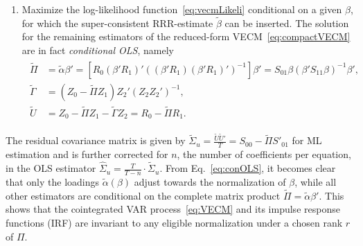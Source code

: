 \begin{enumerate}[label=\textbf{\arabic*.}]
	\item Maximize the log-likelihood function~\eqref{eq:vecmLikeli} conditional on a given $ \beta $, for which the super-consistent RRR-estimate $ \widetilde{\beta} $ can be inserted. The solution for the remaining estimators of the reduced-form VECM~\eqref{eq:compactVECM} are in fact \textit{conditional OLS}, namely
	\begin{align} \label{eq:conOLS}
	\begin{split}
		\widetilde{\Pi} & = \widetilde{\alpha} \beta' = \left[ R^{\ }_0 \left( \beta'R^{\ }_1 \right)' \left( \left( \beta'R^{\ }_1 \right) \left( \beta'R^{\ }_1 \right)' \right)^{-1} \right] \beta' = S_{01} \beta \left( \beta' S_{11} \beta \right)^{-1} \beta', \\
		\widetilde{\Gamma} & = \left( Z^{\ }_0 - \widetilde{\Pi} Z^{\ }_1 \right) Z_2'(Z^{\ }_2 Z_2')^{-1}, \\
		\widetilde{U} & = Z^{\ }_0 - \widetilde{\Pi} Z^{\ }_1 - \widetilde{\Gamma} Z^{\ }_2 = R^{\ }_0 - \widetilde{\Pi} R^{\ }_1.
	\end{split}
	\end{align}
\end{enumerate}
The residual covariance matrix is given by $ \widetilde{\Sigma}_u = \frac{\widetilde{U} \widetilde{U}'}{T} = S_{00} - \widetilde{\Pi} S'_{01} $ for ML estimation and is further corrected for $ n $, the number of coefficients per equation, in the OLS estimator $ \widehat{\Sigma}_u = \frac{T}{T-n} \cdot \widetilde{\Sigma}_u $. From Eq.~\eqref{eq:conOLS}, it becomes clear that only the loadings $ \widetilde{\alpha}(\beta) $ adjust towards the normalization of $ \beta $, while all other estimators are conditional on the complete matrix product $ \widetilde{\Pi} = \widetilde{\alpha} \beta' $. This shows that the cointegrated VAR process~\eqref{eq:VECM} and its impulse response functions (IRF) are invariant to any eligible normalization under a chosen rank $ r $ of $ \Pi $.


